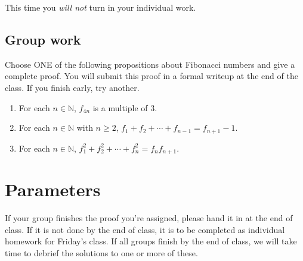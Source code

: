 \documentclass[11pt]{article}
\begin{document}
This time you \emph{will not} turn in your individual work. 


\subsection*{Group work}

Choose ONE of the following propositions about Fibonacci numbers and give a complete proof. You will submit this proof in a formal writeup at the end of the class. If you finish early, try another. 

\begin{enumerate}
	\item For each $n \in \mathbb{N}$, $f_{4n}$ is a multiple of $3$. 
	\item For each $n \in \mathbb{N}$ with $n \geq 2$, $f_1 + f_2 + \cdots + f_{n-1} = f_{n+1} - 1$. 
	\item For each $n \in \mathbb{N}$, $f_1^2 + f_2^2 + \cdots + f_n^2 = f_n f_{n+1}$. 
\end{enumerate}

\section*{Parameters}

If your group finishes the proof you're assigned, please hand it in at the end of class. If it is not done by the end of class, it is to be completed as individual homework for Friday's class. If all groups finish by the end of class, we will take time to debrief the solutions to one or more of these. 
\end{document}
